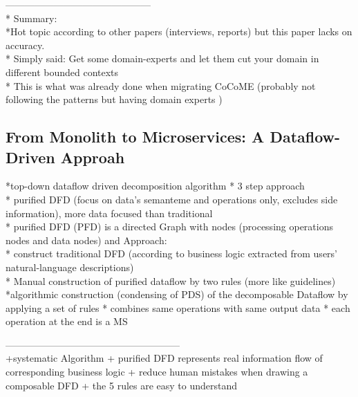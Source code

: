 ---------------------------------------------\\

* Summary: \\
*Hot topic according to other papers (interviews, reports) but this paper lacks on accuracy.  \\
* Simply said: Get some domain-experts and let them cut your domain in different bounded contexts \\
* This is what was already done when migrating CoCoME (probably not following the patterns but having domain experts )

\subsection{From Monolith to Microservices: A Dataflow-Driven Approah}

*top-down dataflow driven decomposition algorithm
* 3 step approach \\
* purified DFD (focus on data's semanteme and operations only, excludes side information), more data focused than traditional \\
* purified DFD (PFD) is a directed Graph with nodes (processing operations nodes and data nodes) and
Approach: \\
* construct traditional DFD (according to business logic extracted from users' natural-language descriptions) \\
* Manual construction of purified dataflow by two rules (more like guidelines)\\
*algorithmic construction (condensing of PDS) of the decomposable Dataflow by applying a set of rules
* combines same operations with same output data
* each operation at the end is a MS


------------------------------------------------------\\

+systematic Algorithm
+ purified DFD represents real information flow of corresponding business logic
+ reduce human mistakes when drawing a composable DFD
+ the 5 rules are easy to understand 

